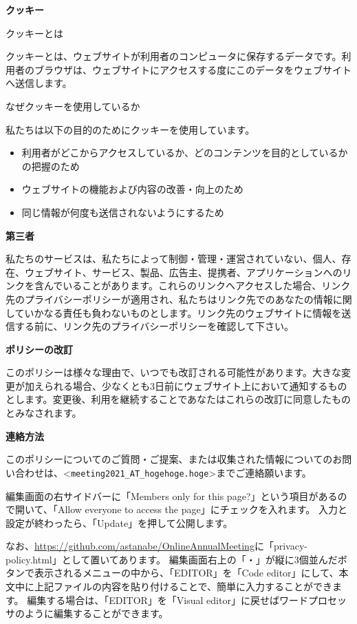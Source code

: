 \documentclass[titlepage,10pt,a4paper,uplatex]{jsbook}
\newenvironment{content}{\begin{shaded}\vspace{-1em}\raggedright\ttfamily\footnotesize\setlength{\baselineskip}{1.4em}}{\end{shaded}\vspace{-1em}}
\renewcommand{\textbf}[1]{{\bfseries\sffamily#1}}
\begin{document}
\begin{content}
\textbf{\Large クッキー}

{\Large クッキーとは}

クッキーとは、ウェブサイトが利用者のコンピュータに保存するデータです。利用者のブラウザは、ウェブサイトにアクセスする度にこのデータをウェブサイトへ送信します。

{\Large なぜクッキーを使用しているか}

私たちは以下の目的のためにクッキーを使用しています。

\begin{itemize}
\item 利用者がどこからアクセスしているか、どのコンテンツを目的としているかの把握のため
\item ウェブサイトの機能および内容の改善・向上のため
\item 同じ情報が何度も送信されないようにするため
\end{itemize}

\textbf{\Large 第三者}

私たちのサービスは、私たちによって制御・管理・運営されていない、個人、存在、ウェブサイト、サービス、製品、広告主、提携者、アプリケーションへのリンクを含んでいることがあります。これらのリンクへアクセスした場合、リンク先のプライバシーポリシーが適用され、私たちはリンク先でのあなたの情報に関していかなる責任も負わないものとします。リンク先のウェブサイトに情報を送信する前に、リンク先のプライバシーポリシーを確認して下さい。

\textbf{\Large ポリシーの改訂}

このポリシーは様々な理由で、いつでも改訂される可能性があります。大きな変更が加えられる場合、少なくとも3日前にウェブサイト上において通知するものとします。変更後、利用を継続することであなたはこれらの改訂に同意したものとみなされます。

\textbf{\Large 連絡方法}

このポリシーについてのご質問・ご提案、または収集された情報についてのお問い合わせは、{\textless}\texttt{meeting2021\_AT\_hogehoge.hoge}{\textgreater}までご連絡願います。
\end{content}

編集画面の右サイドバーに「Members only for this page?」という項目があるので開いて、「Allow everyone to access the page」にチェックを入れます。
入力と設定が終わったら、「Update」を押して公開します。

なお、\url{https://github.com/astanabe/OnlineAnnualMeeting}に「privacy-policy.html」として置いてあります。
編集画面右上の「・」が縦に3個並んだボタンで表示されるメニューの中から、「EDITOR」を「Code editor」にして、本文中に上記ファイルの内容を貼り付けることで、簡単に入力することができます。
編集する場合は、「EDITOR」を「Visual editor」に戻せばワードプロセッサのように編集することができます。
\end{document}
